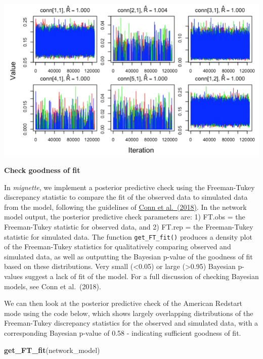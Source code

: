 \documentclass[
]{book}
\newenvironment{Shaded}{\begin{snugshade}}{\end{snugshade}}
\newcommand{\FunctionTok}[1]{\textcolor[rgb]{0.13,0.29,0.53}{\textbf{#1}}}
\newcommand{\NormalTok}[1]{#1}
\begin{document}
\includegraphics[width=8.81in]{./images/mcmc_chains1}

\textbf{Check goodness of fit}

In \emph{mignette}, we implement a posterior predictive check using the Freeman-Tukey discrepancy statistic to compare the fit of the observed data to simulated data from the model, following the guidelines of \href{https://doi.org/10.1002/ecm.1314}{Conn et al.~(2018)}. In the network model output, the posterior predictive check parameters are: 1) FT.obs = the Freeman-Tukey statistic for observed data, and 2) FT.rep = the Freeman-Tukey statistic for simulated data. The function \texttt{get\_FT\_fit()} produces a density plot of the Freeman-Tukey statistics for qualitatively comparing observed and simulated data, as well as outputting the Bayesian p-value of the goodness of fit based on these distributions. Very small (\textless0.05) or large (\textgreater0.95) Bayesian p-values suggest a lack of fit of the model. For a full discussion of checking Bayesian models, see Conn et al.~(2018).

We can then look at the posterior predictive check of the American Redstart mode using the code below, which shows largely overlapping distributions of the Freeman-Tukey discrepancy statistics for the observed and simulated data, with a corresponding Bayesian p-value of 0.58 - indicating sufficient goodness of fit.

\begin{Shaded}
\begin{Highlighting}[]
\FunctionTok{get\_FT\_fit}\NormalTok{(network\_model)}
\end{Highlighting}
\end{Shaded}
\end{document}
